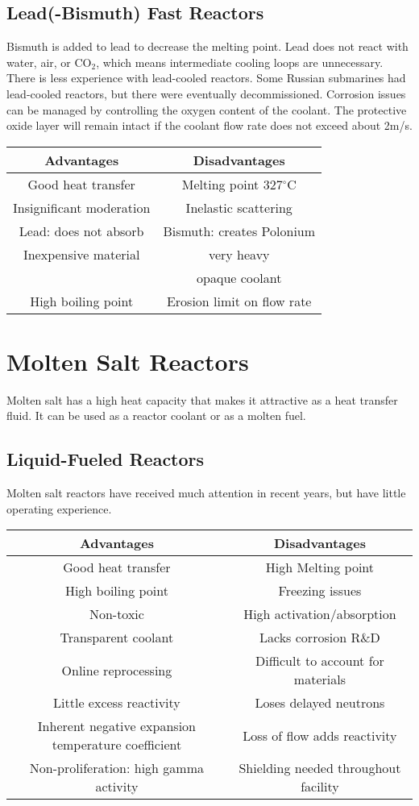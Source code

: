 \subsection{Lead(-Bismuth) Fast Reactors}
Bismuth is added to lead to decrease the melting point. Lead does not react with water, air, or CO$_2$, which means intermediate cooling loops are unnecessary. 
There is less experience with lead-cooled reactors. Some Russian submarines had lead-cooled reactors, but there were eventually decommissioned.
Corrosion issues can be managed by controlling the oxygen content of the coolant. The protective oxide layer will remain intact if the coolant flow rate does not exceed about 2m/s.
\begin{table}[!h]
\begin{tabular}{c|c}
  Advantages & Disadvantages \\
  \hline
  Good heat transfer & Melting point 327$^{\circ}$C\\
  Insignificant moderation & Inelastic scattering\\
  Lead: does not absorb & Bismuth: creates Polonium\\
  Inexpensive material & very heavy\\ 
   & opaque coolant\\
  High boiling point & Erosion limit on flow rate\\
\end{tabular}
\end{table}


\section{Molten Salt Reactors}
Molten salt has a high heat capacity that makes it attractive as a heat transfer fluid. It can be used as a reactor coolant or as a molten fuel.
\subsection{Liquid-Fueled Reactors}
Molten salt reactors have received much attention in recent years, but have little operating experience. 
\begin{table}[!h]
\begin{tabular}{c|c}
  Advantages & Disadvantages \\
  \hline
  Good heat transfer & High Melting point \\
  High boiling point & Freezing issues\\
  Non-toxic & High activation/absorption \\
  Transparent coolant & Lacks corrosion R\&D \\
  Online reprocessing & Difficult to account for materials\\
  Little excess reactivity & Loses delayed neutrons\\
  Inherent negative expansion temperature coefficient & Loss of flow adds reactivity\\
  Non-proliferation: high gamma activity & Shielding needed throughout facility\\
\end{tabular}
\end{table}

